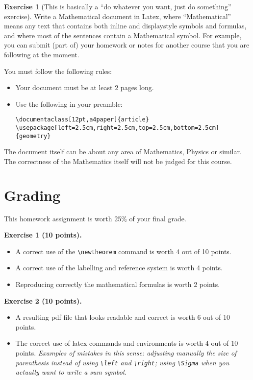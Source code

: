 \documentclass[12pt,a4paper]{article}
\theoremstyle{definition}
\newtheorem{ex}{Exercise}
\theoremstyle{definition}
\begin{document}
\vspace{0.8cm}

\begin{ex}
[This is basically a ``do whatever you want, just do something'' exercise]
Write a Mathematical document in Latex, where ``Mathematical'' means any text
that contains both inline and displaystyle symbols and formulas, and where most
of the sentences contain a Mathematical symbol.
For example, you can submit (part of) your homework or notes for another course
that you are following at the moment.

You must follow the following rules:
\begin{itemize}
  \item Your document must be at least 2 pages long.
  \item Use the following in your preamble:
    \begin{verbatim}
\documentaclass[12pt,a4paper]{article}
\usepackage[left=2.5cm,right=2.5cm,top=2.5cm,bottom=2.5cm]{geometry}
    \end{verbatim}
\end{itemize}
The document itself can be about any area of Mathematics, Physics or similar.
The correctness of the Mathematics itself will not be judged for this course.
\end{ex}

\section*{Grading}

This homework assignment is worth 25\% of your final grade.

\vspace{0.3cm}
\textbf{Exercise 1 (10 points).}
\begin{itemize}
  \item A correct use of the \texttt{\textbackslash newtheorem} command is
        worth 4 out of 10 points.
  \item A correct use of the labelling and reference system is worth 4 points.
  \item Reproducing correctly the mathematical formulas is worth 2 points.
\end{itemize}

\textbf{Exercise 2 (10 points).}
\begin{itemize}
  \item A resulting pdf file that looks readable and correct is worth 6 out of
        10 points.
  \item The correct use of latex commands and environments is worth 4 out of
        10 points. \emph{Examples of mistakes in this sense: adjusting manually
        the size of parenthesis instead of using \texttt{\textbackslash left}
        and \texttt{\textbackslash right}; using \texttt{\textbackslash Sigma}
        when you actually want to write a sum symbol.}
\end{itemize}
\end{document}
